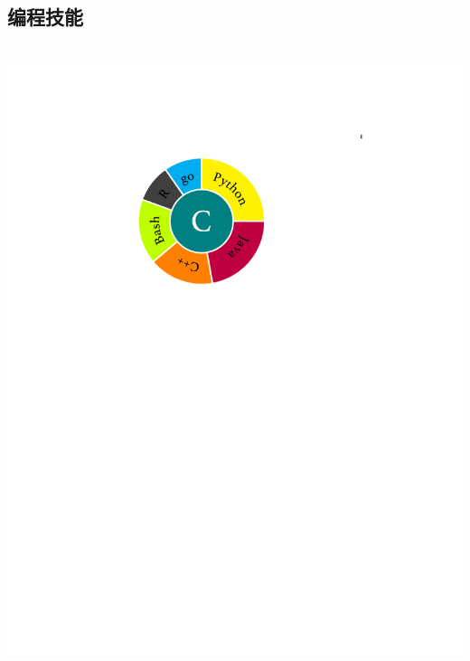 \documentclass[]{friggeri-cv}
\begin{document}
\begin{aside}
\section{\cuti 编程技能}
    ~
    \includegraphics[scale=0.62]{img/programming.pdf}
    ~

\end{aside}
\end{document}
